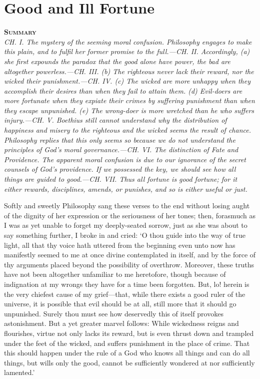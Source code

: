 \documentclass[12pt]{book}
\newenvironment{abstract}%
  {\noindent \textbf{\scshape Summary} \\ \rightskip1in\itshape\small}%
  {\bigskip}
\begin{document}

\chapter{Good and Ill Fortune}

\begin{abstract}
     CH. I. The mystery of the seeming moral confusion. Philosophy
     engages to make this plain, and to fulfil her former promise to the
     full.---CH. II. Accordingly, (a) she first expounds the paradox that
     the good alone have power, the bad are altogether powerless.---CH.
     III. (b) The righteous never lack their reward, nor the wicked
     their punishment.---CH. IV. (c) The wicked are more unhappy when
     they accomplish their desires than when they fail to attain them.
     (d) Evil-doers are more fortunate when they expiate their crimes by
     suffering punishment than when they escape unpunished. (e) The
     wrong-doer is more wretched than he who suffers injury.---CH. V.
     Boethius still cannot understand why the distribution of happiness
     and misery to the righteous and the wicked seems the result of
     chance. Philosophy replies that this only seems so because we do
     not understand the principles of God's moral governance.---CH. VI.
     The distinction of Fate and Providence. The apparent moral
     confusion is due to our ignorance of the secret counsels of God's
     providence. If we possessed the key, we should see how all things
     are guided to good.---CH. VII. Thus all fortune is good fortune; for
     it either rewards, disciplines, amends, or punishes, and so is
     either useful or just.
\end{abstract}


Softly and sweetly Philosophy sang these verses to the end without
losing aught of the dignity of her expression or the seriousness of her
tones; then, forasmuch as I was as yet unable to forget my deeply-seated
sorrow, just as she was about to say something further, I broke in and
cried: `O thou guide into the way of true light, all that thy voice hath
uttered from the beginning even unto now has manifestly seemed to me at
once divine contemplated in itself, and by the force of thy arguments
placed beyond the possibility of overthrow. Moreover, these truths have
not been altogether unfamiliar to me heretofore, though because of
indignation at my wrongs they have for a time been forgotten. But, lo!
herein is the very chiefest cause of my grief---that, while there exists
a good ruler of the universe, it is possible that evil should be at all,
still more that it should go unpunished. Surely thou must see how
deservedly this of itself provokes astonishment. But a yet greater
marvel follows: While wickedness reigns and flourishes, virtue not only
lacks its reward, but is even thrust down and trampled under the feet of
the wicked, and suffers punishment in the place of crime. That this
should happen under the rule of a God who knows all things and can do
all things, but wills only the good, cannot be sufficiently wondered at
nor sufficiently lamented.'
\end{document}
